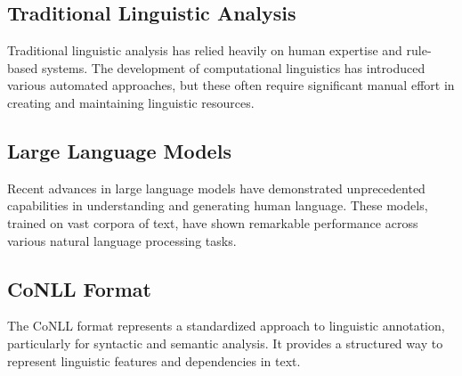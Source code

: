 \subsection{Traditional Linguistic Analysis}
Traditional linguistic analysis has relied heavily on human expertise and rule-based systems. The development of computational linguistics has introduced various automated approaches, but these often require significant manual effort in creating and maintaining linguistic resources.

\subsection{Large Language Models}
Recent advances in large language models have demonstrated unprecedented capabilities in understanding and generating human language. These models, trained on vast corpora of text, have shown remarkable performance across various natural language processing tasks.

\subsection{CoNLL Format}
The CoNLL format represents a standardized approach to linguistic annotation, particularly for syntactic and semantic analysis. It provides a structured way to represent linguistic features and dependencies in text. 